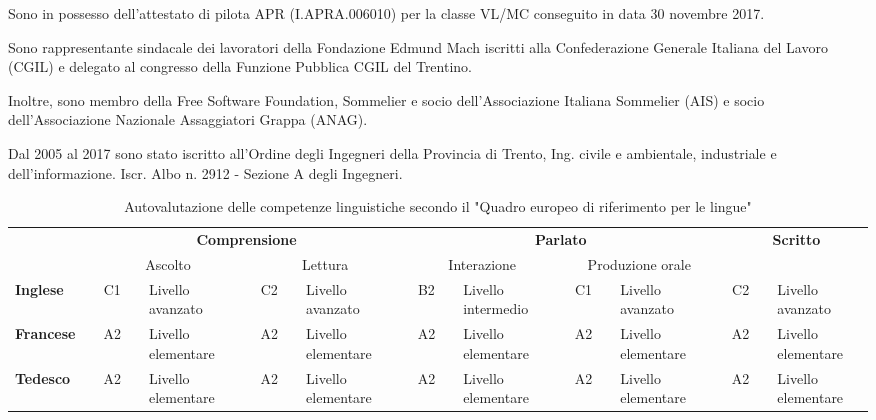 \documentclass{curriculum}
\begin{document}
        Sono in possesso dell'attestato di pilota APR (I.APRA.006010) per la classe VL/MC conseguito in data 30 novembre 2017.
        
        Sono rappresentante sindacale dei lavoratori della Fondazione Edmund Mach iscritti alla Confederazione Generale Italiana del Lavoro (CGIL) e delegato al congresso della Funzione Pubblica CGIL del Trentino.
        
        Inoltre, sono membro della Free Software Foundation, Sommelier e socio dell'Associazione Italiana Sommelier (AIS) e socio dell'Associazione Nazionale Assaggiatori Grappa (ANAG).
        
        Dal 2005 al 2017 sono stato iscritto all'Ordine degli Ingegneri della Provincia di Trento, Ing. civile e ambientale, industriale e dell'informazione. Iscr. Albo n. 2912 - Sezione A degli Ingegneri. 
        
        \begin{table}[h]
        \centering
        \fontsize{8}{9}\selectfont
            \begin{tabular}{l c c c l c c c l c c c l c c c l c c c l}
                \toprule
                & & \multicolumn{7}{c}{\textbf{Comprensione}} & & \multicolumn{7}{c}{\textbf{Parlato}} & & \multicolumn{3}{c}{\textbf{Scritto}}\\
                & & \multicolumn{3}{c}{Ascolto} & &\multicolumn{3}{c}{Lettura} & & \multicolumn{3}{c}{Interazione} & &\multicolumn{3}{c}{Produzione orale}  & & \multicolumn{3}{c}{}\\
                \cmidrule{3-9} \cmidrule{11-17} \cmidrule{19-21}
                \textbf{Inglese} & \phantom{ab} & C1 & \phantom{a} & Livello avanzato & \phantom{ab} & C2 & \phantom{a} & Livello avanzato & \phantom{ab} & B2 & \phantom{a} & Livello intermedio & \phantom{ab} & C1 & \phantom{a} & Livello avanzato & \phantom{ab} & C2 & \phantom{a} & Livello avanzato\\
                \textbf{Francese} & \phantom{ab} & A2 & \phantom{a} & Livello elementare & \phantom{ab} & A2 & \phantom{a} & Livello elementare & \phantom{ab} & A2 & \phantom{a} & Livello elementare & \phantom{ab} & A2 & \phantom{a} & Livello elementare & \phantom{ab} & A2 & \phantom{a} & Livello elementare\\
                \textbf{Tedesco}  & \phantom{ab} & A2 & \phantom{a} & Livello elementare & \phantom{ab} & A2 & \phantom{a} & Livello elementare & \phantom{ab} & A2 & \phantom{a} & Livello elementare & \phantom{ab} & A2 & \phantom{a} & Livello elementare & \phantom{ab} & A2 & \phantom{a} & Livello elementare\\
                \bottomrule
            \end{tabular}
            \caption*{\small Autovalutazione delle competenze linguistiche secondo il "Quadro europeo di riferimento per le lingue"}
        \end{table}
\end{document}
